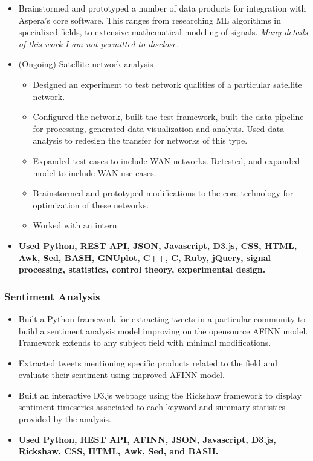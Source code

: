 \documentclass[a4paper,10pt,notitlepage]{article}
\begin{document}
\begin{itemize}
\begin{itemize}
					\end{itemize}
	\vspace{-5pt}\item 	Brainstormed and prototyped a number of data products for integration with Aspera's core software. This ranges from researching ML algorithms in specialized fields, to extensive mathematical modeling of signals. \textit{Many details of this work I am not permitted to disclose.}
	\vspace{-5pt}\item 	(Ongoing) Satellite network analysis \begin{itemize}
					\item 	Designed an experiment to test network qualities of a particular satellite network. 
					\item 	Configured the network, built the test framework, built the data pipeline for processing, generated data visualization and analysis. Used data analysis to redesign the transfer for networks of this type. 
					\item 	Expanded test cases to include WAN networks. Retested, and expanded model to include WAN use-cases. 
					\item 	Brainstormed and prototyped modifications to the core technology for optimization of these networks. 						\item 	Worked with an intern.
					\end{itemize}
	 \vspace{-5pt}\item 	\textbf{Used Python, REST API, JSON, Javascript, D3.js, CSS, HTML, Awk, Sed, BASH, GNUplot, C++, C, Ruby, jQuery, signal processing, statistics, control theory, experimental design.}
	\end{itemize}

\subsubsection*{Sentiment Analysis}
	\begin{itemize}
	\vspace{-5pt}\item 	Built a Python framework for extracting tweets in a particular community to build a sentiment analysis model improving on the opensource AFINN model. Framework extends to any subject field with minimal modifications.
	\vspace{-5pt}\item 	Extracted tweets mentioning specific products related to the field and evaluate their sentiment using improved AFINN model.
	\vspace{-5pt}\item 	Built an interactive D3.js webpage using the Rickshaw framework to display sentiment timeseries associated to each keyword and summary statistics provided by the analysis.
	 \vspace{-5pt}\item 	\textbf{Used Python, REST API, AFINN, JSON, Javascript, D3.js, Rickshaw, CSS, HTML, Awk, Sed, and BASH.}
	\end{itemize}
\end{document}
